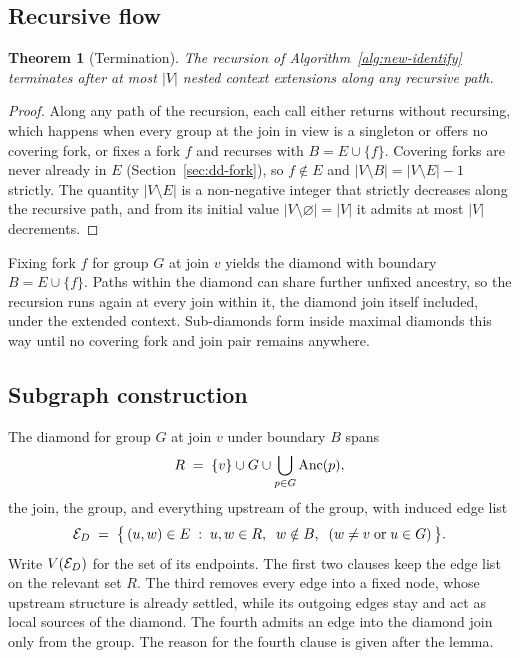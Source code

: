\documentclass[12pt]{report}
\newtheorem{theorem}{Theorem}
\begin{document}
\subsection{Recursive flow}
\label{sec:dd-loop}

\begin{theorem}[Termination]
\label{thm:termination}
The recursion of Algorithm~\ref{alg:new-identify} terminates after at most $|V|$ nested context extensions along any recursive path.
\end{theorem}

\begin{proof}
Along any path of the recursion, each call either returns without recursing, which happens when every group at the join in view is a singleton or offers no covering fork, or fixes a fork $f$ and recurses with $B = E \cup \{f\}$. Covering forks are never already in $E$ (Section~\ref{sec:dd-fork}), so $f \notin E$ and $|V \setminus B| = |V \setminus E| - 1$ strictly. The quantity $|V \setminus E|$ is a non-negative integer that strictly decreases along the recursive path, and from its initial value $|V \setminus \varnothing| = |V|$ it admits at most $|V|$ decrements.
\end{proof}

Fixing fork $f$ for group $G$ at join $v$ yields the diamond with boundary $B = E \cup \{f\}$. Paths within the diamond can share further unfixed ancestry, so the recursion runs again at every join within it, the diamond join itself included, under the extended context. Sub-diamonds form inside maximal diamonds this way until no covering fork and join pair remains anywhere.

\subsection{Subgraph construction}
\label{sec:dd-edges}

The diamond for group $G$ at join $v$ under boundary $B$ spans
\[
R \;=\; \{v\} \cup G \cup \bigcup_{p \in G}\mathrm{Anc}(p),
\]
the join, the group, and everything upstream of the group, with induced edge list
\[
\mathcal{E}_D \;=\; \bigl\{\, (u,w) \in E \;:\; u,w \in R,\;\; w \notin B,\;\; (w \neq v \;\text{or}\; u \in G) \,\bigr\}.
\]
Write $V(\mathcal{E}_D)$ for the set of its endpoints. The first two clauses keep the edge list on the relevant set $R$. The third removes every edge into a fixed node, whose upstream structure is already settled, while its outgoing edges stay and act as local sources of the diamond. The fourth admits an edge into the diamond join only from the group. The reason for the fourth clause is given after the lemma.
\end{document}
